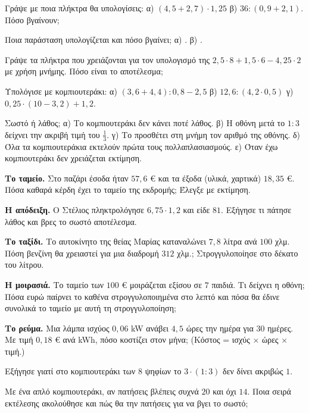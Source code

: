 \ex Γράψε με ποια πλήκτρα θα υπολογίσεις: α) $(4{,}5+2{,}7)\cdot1{,}25$ \quad β) $36:(0{,}9+2{,}1)$. Πόσο βγαίνουν;

\ex Ποια παράσταση υπολογίζεται και πόσο βγαίνει; α)  \kpo{}\kis{} \kpo{}\kis{} . \quad β) \kpl{}\kis\kdi{}\kis.

\ex Γράψε τα πλήκτρα που χρειάζονται για τον υπολογισμό της $2{,}5\cdot8+1{,}5\cdot6-4{,}25\cdot2$ με χρήση μνήμης. Πόσο είναι το αποτέλεσμα;

\ex Υπολόγισε με κομπιουτεράκι: α) $(3{,}6+4{,}4):0{,}8-2{,}5$ \quad β) $12{,}6:(4{,}2\cdot0{,}5)$ \quad γ) $0{,}25\cdot(10-3{,}2)+1{,}2$.

\ex Σωστό ή λάθος; α) Το κομπιουτεράκι δεν κάνει ποτέ λάθος. \quad β) Η οθόνη μετά το $1:3$ δείχνει την ακριβή τιμή του $\frac{1}{3}$. \quad γ) Το  προσθέτει στη μνήμη τον αριθμό της οθόνης. \quad δ) Όλα τα κομπιουτεράκια εκτελούν πρώτα τους πολλαπλασιασμούς. \quad ε) Όταν έχω κομπιουτεράκι δεν χρειάζεται εκτίμηση.


\ex \textbf{Το ταμείο.} Στο παζάρι έσοδα ήταν $57{,}6$ € και τα έξοδα (υλικά, χαρτικά) $18{,}35$ €. Πόσα καθαρά κέρδη έχει το ταμείο της εκδρομής; Έλεγξε με εκτίμηση.

\ex \textbf{Η απόδειξη.} Ο Στέλιος πληκτρολόγησε $6{,}75\cdot1{,}2$ και είδε $81$. Εξήγησε τι πάτησε λάθος και βρες το σωστό αποτέλεσμα.

\ex \textbf{Το ταξίδι.} Το αυτοκίνητο της θείας Μαρίας καταναλώνει $7{,}8$ λίτρα ανά $100$ χλμ. Πόση βενζίνη θα χρειαστεί για μια διαδρομή $312$ χλμ.; Στρογγυλοποίησε στο δέκατο του λίτρου.

\ex \textbf{Η μοιρασιά.} Το ταμείο των $100$ € μοιράζεται εξίσου σε $7$ παιδιά. Τι δείχνει η οθόνη; Πόσα ευρώ παίρνει το καθένα στρογγυλοποιημένα στο λεπτό και πόσα θα έδινε συνολικά το ταμείο με αυτή τη στρογγυλοποίηση;

\ex \textbf{Το ρεύμα.} Μια λάμπα ισχύος $0{,}06$ kW ανάβει $4{,}5$ ώρες την ημέρα για $30$ ημέρες. Με τιμή $0{,}18$ € ανά kWh, πόσο κοστίζει στον μήνα; (Κόστος = ισχύς × ώρες × τιμή.)


\ex Εξήγησε γιατί στο κομπιουτεράκι των $8$ ψηφίων το $3\cdot(1:3)$ δεν δίνει ακριβώς $1$.

\ex Με ένα απλό κομπιουτεράκι, αν πατήσεις \kpl{}\kpo{}\kis{} βλέπεις συχνά $20$ και όχι $14$. Ποια σειρά εκτέλεσης ακολούθησε και πώς θα την πατήσεις για να βγει το σωστό;

